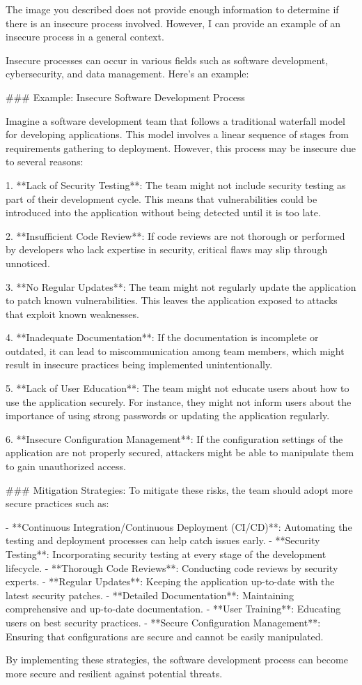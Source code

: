 The image you described does not provide enough information to determine if there is an insecure process involved. However, I can provide an example of an insecure process in a general context.

Insecure processes can occur in various fields such as software development, cybersecurity, and data management. Here's an example:

### Example: Insecure Software Development Process

Imagine a software development team that follows a traditional waterfall model for developing applications. This model involves a linear sequence of stages from requirements gathering to deployment. However, this process may be insecure due to several reasons:

1. **Lack of Security Testing**: The team might not include security testing as part of their development cycle. This means that vulnerabilities could be introduced into the application without being detected until it is too late.
   
2. **Insufficient Code Review**: If code reviews are not thorough or performed by developers who lack expertise in security, critical flaws may slip through unnoticed.

3. **No Regular Updates**: The team might not regularly update the application to patch known vulnerabilities. This leaves the application exposed to attacks that exploit known weaknesses.

4. **Inadequate Documentation**: If the documentation is incomplete or outdated, it can lead to miscommunication among team members, which might result in insecure practices being implemented unintentionally.

5. **Lack of User Education**: The team might not educate users about how to use the application securely. For instance, they might not inform users about the importance of using strong passwords or updating the application regularly.

6. **Insecure Configuration Management**: If the configuration settings of the application are not properly secured, attackers might be able to manipulate them to gain unauthorized access.

### Mitigation Strategies:
To mitigate these risks, the team should adopt more secure practices such as:

- **Continuous Integration/Continuous Deployment (CI/CD)**: Automating the testing and deployment processes can help catch issues early.
- **Security Testing**: Incorporating security testing at every stage of the development lifecycle.
- **Thorough Code Reviews**: Conducting code reviews by security experts.
- **Regular Updates**: Keeping the application up-to-date with the latest security patches.
- **Detailed Documentation**: Maintaining comprehensive and up-to-date documentation.
- **User Training**: Educating users on best security practices.
- **Secure Configuration Management**: Ensuring that configurations are secure and cannot be easily manipulated.

By implementing these strategies, the software development process can become more secure and resilient against potential threats.
